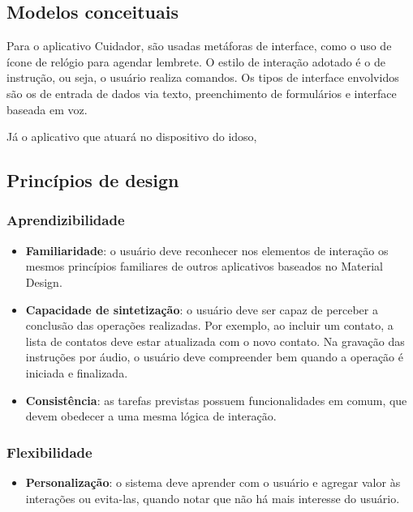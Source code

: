 \subsection{Modelos conceituais}

Para o aplicativo Cuidador, são usadas metáforas de interface, como o uso de ícone de relógio para agendar lembrete. O estilo de interação adotado é o de instrução, ou seja, o usuário realiza comandos. Os tipos de interface envolvidos são os de entrada de dados via texto, preenchimento de formulários e interface baseada em voz.

Já o aplicativo que atuará no dispositivo do idoso, 

\subsection{Princípios de design}

\subsubsection*{Aprendizibilidade}

\begin{itemize}
    \item \textbf{Familiaridade}: o usuário deve reconhecer nos elementos de interação os mesmos princípios familiares de outros aplicativos baseados no Material Design.  
    \item \textbf{Capacidade de sintetização}: o usuário deve ser capaz de perceber a conclusão das operações realizadas. Por exemplo, ao incluir um contato, a lista de contatos deve estar atualizada com o novo contato. Na gravação das instruções por áudio, o usuário deve compreender bem quando a operação é iniciada e finalizada.
    \item \textbf{Consistência}: as tarefas previstas possuem funcionalidades em comum, que devem obedecer a uma mesma lógica de interação.
\end{itemize}

\subsubsection*{Flexibilidade}

\begin{itemize}
    \item \textbf{Personalização}: o sistema deve aprender com o usuário e agregar valor às interações ou evita-las, quando notar que não há mais interesse do usuário.
\end{itemize}

